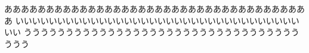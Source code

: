 \documentclass[pdflatex]{jlreq}
\begin{document}
あああああああああああああああああああああああああああああああああああああ
\clearpage
いいいいいいいいいいいいいいいいいいいいいいいいいいいいいいいいいいいい
\clearpage
うううううううううううううううううううううううううううううううううううう
\end{document}
